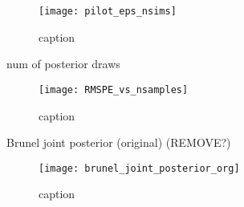 \begin{figure}[H]
    \centering
    \texttt{[image: pilot\_eps\_nsims]}
    \caption{caption}
    \label{fig:fig1}
\end{figure} 

num of posterior draws

\begin{figure}[H]
    \centering
    \texttt{[image: RMSPE\_vs\_nsamples]}
    \caption{caption}
    \label{fig:fig1}
\end{figure} 


Brunel joint posterior (original) (REMOVE?)

\begin{figure}[H]
    \centering
    \texttt{[image: brunel\_joint\_posterior\_org]}
    \caption{caption}
    \label{fig:fig1}
\end{figure} 



